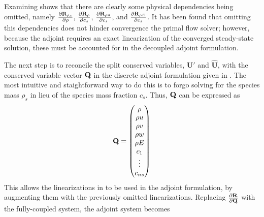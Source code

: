Examining  shows that there are clearly some
physical dependencies being omitted, namely $\frac{\partial \mathbf R_{\rho_s}}{\partial \rho}$,
$\frac{\partial \mathbf R_{\rho}}{\partial c_s}$, $\frac{\partial \mathbf R_{\rho \mathbf u}}{\partial c_s}$, and $\frac{\partial \mathbf R_{\rho E}}{\partial c_s}$.  It has
been found\cite{candler} that omitting this dependencies does not hinder convergence
the primal flow solver; however, because the adjoint requires an exact
linearization of the converged steady-state solution, these must be accounted
for in the decoupled adjoint formulation.

The next step is to reconcile the split conserved variables, $\mathbf{U}'$ and
$\mathbf{\hat{U}}$, with the conserved variable vector $\mathbf Q$ in the discrete
adjoint formulation given in . The most intuitive and
staightforward way to do this is to forgo solving for the species mass $\rho_s$
in lieu of the species mass fraction $c_s$.  Thus, $\mathbf Q$ can be expressed as
\begin{equation}
  \mathbf Q =
  \begin{pmatrix}
  	\rho \\
  	\rho u \\
  	\rho v \\
  	\rho w \\
  	\rho E \\
    c_1 \\
    \vdots \\
    c_{ns}
  \end{pmatrix}
  \label{q-vec}
\end{equation}
This allows the linearizations in  to be used
in the adjoint formulation, by augmenting them with the previously omitted
linearizations.  Replacing $\frac{\partial \mathbf R_{}}{\partial \mathbf Q}$ with the fully-coupled system, the
adjoint system becomes
